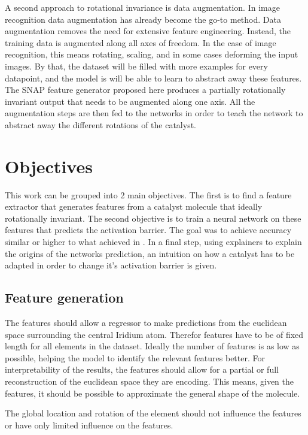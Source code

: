 A second approach to rotational invariance is data augmentation.
In image recognition data augmentation has already become the go-to method.
Data augmentation removes the need for extensive feature engineering.
Instead, the training data is augmented along all axes of freedom.
In the case of image recognition, this means rotating, scaling, and in some cases deforming the input images.
By that, the dataset will be filled with more examples for every datapoint, and the model is will be able to learn to 
abstract away these features. %
The SNAP feature generator proposed here produces a partially rotationally invariant output that needs to be augmented along one axis.
All the augmentation steps are then fed to the networks in order to teach the network to abstract away the different rotations of the catalyst.

\section{Objectives}

This work can be grouped into 2 main objectives. 
The first is to find a feature extractor that generates features from a catalyst molecule that ideally rotationally invariant.
The second objective is to train a neural network on these features that predicts the activation barrier.
The goal was to achieve accuracy similar or higher to what \citeauthor{friederich_dos} achieved in \cite{friederich_dos}.
In a final step, using explainers to explain the origins of the networks prediction, an intuition on how a catalyst has 
to be adapted in order to change it's activation barrier is given.

\subsection{Feature generation}

The features should allow a regressor to make predictions from the euclidean space surrounding the central Iridium atom.
Therefor features have to be of fixed length for all elements in the dataset.
Ideally the number of features is as low as possible, helping the model to identify the relevant features better.
For interpretability of the results, the features should allow for a partial or full reconstruction of the euclidean space they are encoding.
This means, given the features, it should be possible to approximate the general shape of the molecule.

The global location and rotation of the element should not influence the features or have only limited influence on the features.

